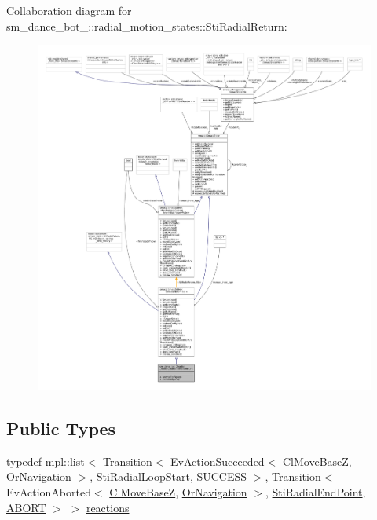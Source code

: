 Collaboration diagram for sm\+\_\+dance\+\_\+bot\+\_\+:\+:radial\+\_\+motion\+\_\+states\+:\+:Sti\+Radial\+Return\+:
\nopagebreak
\begin{figure}[H]
\begin{center}
\leavevmode
\includegraphics[width=350pt]{structsm__dance__bot__2_1_1radial__motion__states_1_1StiRadialReturn__coll__graph}
\end{center}
\end{figure}
\subsection*{Public Types}
\begin{DoxyCompactItemize}
\item 
typedef mpl\+::list$<$ Transition$<$ Ev\+Action\+Succeeded$<$ \hyperlink{classmove__base__z__client_1_1ClMoveBaseZ}{Cl\+Move\+BaseZ}, \hyperlink{classsm__dance__bot__2_1_1OrNavigation}{Or\+Navigation} $>$, \hyperlink{structsm__dance__bot__2_1_1radial__motion__states_1_1StiRadialLoopStart}{Sti\+Radial\+Loop\+Start}, \hyperlink{classSUCCESS}{S\+U\+C\+C\+E\+SS} $>$, Transition$<$ Ev\+Action\+Aborted$<$ \hyperlink{classmove__base__z__client_1_1ClMoveBaseZ}{Cl\+Move\+BaseZ}, \hyperlink{classsm__dance__bot__2_1_1OrNavigation}{Or\+Navigation} $>$, \hyperlink{structsm__dance__bot__2_1_1radial__motion__states_1_1StiRadialEndPoint}{Sti\+Radial\+End\+Point}, \hyperlink{classABORT}{A\+B\+O\+RT} $>$ $>$ \hyperlink{structsm__dance__bot__2_1_1radial__motion__states_1_1StiRadialReturn_a3b589fd16dd6f3e94a30bdfb0f2c2064}{reactions}
\end{DoxyCompactItemize}
